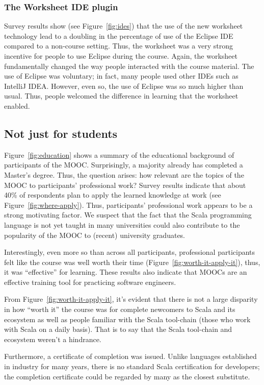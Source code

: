 \documentclass{sig-alternate}
\begin{document}
\subsubsection{The Worksheet IDE plugin}

Survey results show (see Figure~\ref{fig:ides}) that the use
of the new worksheet technology lead to a doubling in the percentage of use of
the Eclipse IDE compared to a non-course setting. Thus, the worksheet was a
very strong incentive for people to use Eclipse during the course. Again, the
worksheet fundamentally changed the way people interacted with the course
material. The use of Eclipse was voluntary; in fact, many people used other
IDEs such as IntelliJ IDEA. However, even so, the use of Eclipse was so much
higher than usual. Thus, people welcomed the difference in learning that the
worksheet enabled.


\subsection{Not just for students}

Figure~\ref{fig:education} shows a summary of the educational background of
participants of the MOOC. Surprisingly, a majority already has completed a
Master's degree. Thus, the question arises: how relevant are the topics of the
MOOC to participants' professional work? Survey results indicate that about
40\% of respondents plan to apply the learned knowledge at work (see
Figure~\ref{fig:where-apply}). Thus, participants' professional work appears
to be a strong motivating factor. We suspect that the fact that the Scala
programming language is not yet taught in many universities could also
contribute to the popularity of the MOOC to (recent) university graduates.

Interestingly, even more so than across all participants, professional
participants felt like the course was well worth their time
(Figure~\ref{fig:worth-it-apply-it}), thus, it was ``effective'' for learning.
These results also indicate that MOOCs are an effective training tool for practicing
software engineers.

From Figure~\ref{fig:worth-it-apply-it}, it's evident that there is not a large disparity in how ``worth it'' the course was for complete newcomers to Scala and its ecosystem as well as people familiar with the Scala tool-chain (those who work with Scala on a daily basis). That is to say that the Scala tool-chain and ecosystem weren't a hindrance.

Furthermore, a certificate of completion was issued. Unlike languages
established in industry for many years, there is no standard Scala
certification for developers; the completion certificate could be regarded by
many as the closest substitute.
\end{document}
